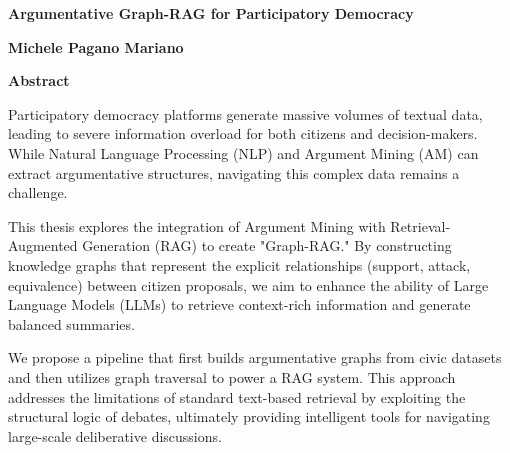 


\begin{center}
    \textbf{Argumentative Graph-RAG for Participatory Democracy}
    
    \vspace{0.4cm}
    
    \vspace{0.4cm}
    \textbf{Michele Pagano Mariano}
    
    \vspace{0.9cm}
    \textbf{Abstract}
    
\end{center}

Participatory democracy platforms generate massive volumes of textual data, leading to severe information overload for both citizens and decision-makers. While Natural Language Processing (NLP) and Argument Mining (AM) can extract argumentative structures, navigating this complex data remains a challenge.
    
This thesis explores the integration of Argument Mining with Retrieval-Augmented Generation (RAG) to create "Graph-RAG." By constructing knowledge graphs that represent the explicit relationships (support, attack, equivalence) between citizen proposals, we aim to enhance the ability of Large Language Models (LLMs) to retrieve context-rich information and generate balanced summaries.
    
We propose a pipeline that first builds argumentative graphs from civic datasets and then utilizes graph traversal to power a RAG system. This approach addresses the limitations of standard text-based retrieval by exploiting the structural logic of debates, ultimately providing intelligent tools for navigating large-scale deliberative discussions.